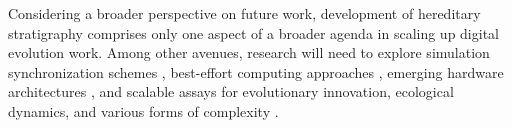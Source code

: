 Considering a broader perspective on future work, development of hereditary stratigraphy comprises only one aspect of a broader agenda in scaling up digital evolution work.
Among other avenues, research will need to explore simulation synchronization schemes \citep{PDES}, best-effort computing approaches \citep{conduit,ackley}, emerging hardware architectures \citep{trackable,gpuevolution}, and scalable assays for evolutionary innovation, ecological dynamics, and various forms of complexity \citep{activitystatistics,dolson,crypticsequencecomplexity,towards,casestudyof}.
